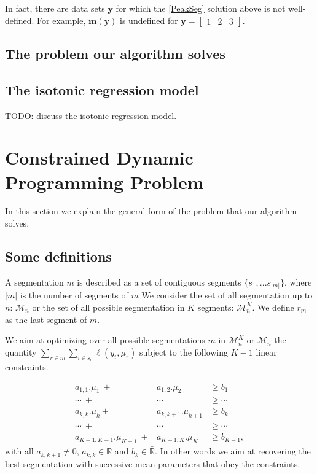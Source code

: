 \documentclass{article}
\begin{document}
In fact, there are data sets $\mathbf y$ for which the \ref{PeakSeg}
solution above is not well-defined. For example,
$\mathbf{\tilde m}(\mathbf y)$ is undefined for
$\mathbf y = \left[\begin{array}{ccc} 1 & 2 & 3 \end{array}\right]$.

\subsection{The problem our algorithm solves}



\subsection{The isotonic regression model}

TODO: discuss the isotonic regression model.

\newcommand{\FCC}{\widetilde{C}}
\newcommand{\M}{\mathcal{M}}
\section{Constrained Dynamic Programming Problem}

In this section we explain the general form of the problem that our algorithm solves.

\subsection{Some definitions}

A segmentation $m$ is described as a set of contiguous segments $\{s_1, ... s_{|m|} \}$, where $|m|$ is the number of segments of $m$
We consider the set of all segmentation up to $n$: $\M_n$ 
or the set of all possible segmentation in $K$ segments: $\M^K_n$.
We define $r_m$ as the last segment of $m$.

We aim at optimizing over all possible segmentations $m$ in $\M^K_n$ or $\M_n$
 the quantity
$\sum_{r \in m} \sum_{i \in s_{r}} \ell(y_i, \mu_{r})$ subject to
the following $K-1$ linear constraints. 

\begin{eqnarray*}
a_{1,1}.\mu_1 \ + & a_{1,2}.\mu_2  & \geq  b_1 \\
\cdots \ +&  \cdots & \geq \cdots \\
a_{k,k}.\mu_{k} + & a_{k,k+1}.\mu_{k+1}  & \geq  b_{k} \\
\cdots \ +&  \cdots & \geq \cdots  \\
a_{K-1,K-1}.\mu_{K-1} \ +& a_{K-1,K}.\mu_K & \geq  b_{K-1},
\end{eqnarray*}
with all $a_{k,k+1} \neq 0$, $a_{k,k} \in \mathbb{R}$ and
$b_{k} \in \bar{\mathbb{R}}.$ In other words we aim at recovering the
best segmentation with successive mean parameters that obey the
constraints.
\end{document}
